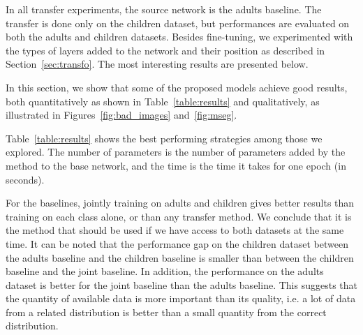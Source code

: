 

In all transfer experiments, the source network is the adults baseline. The transfer is done only on the children dataset, but performances are evaluated on both the adults and children datasets. Besides fine-tuning, we experimented with the types of layers added to the network and their position as described in Section~\ref{sec:transfo}. The most interesting results are presented below.

In this section, we show that some of the proposed models achieve good results, both quantitatively as shown in Table~\ref{table:results} and qualitatively, as illustrated in Figures~\ref{fig:bad_images} and~\ref{fig:mseg}.

Table~\ref{table:results} shows the best performing strategies among those we explored. 
The number of parameters is the number of parameters added by the method to the base network, and the time is the time it takes for one epoch (in seconds).

For the baselines, jointly training on adults and children gives better results than training on each class alone, or than any transfer method. We conclude that it is the method that should be used if we have access to both datasets at the same time. It can be noted that the performance gap on the children dataset between the adults baseline and the children baseline is smaller than between the children baseline and the joint baseline. In addition, the performance on the adults dataset is better for the joint baseline than the adults baseline. This suggests that the quantity of available data is more important than its quality, i.e. a lot of data from a related distribution is better than a small quantity from the correct distribution.


